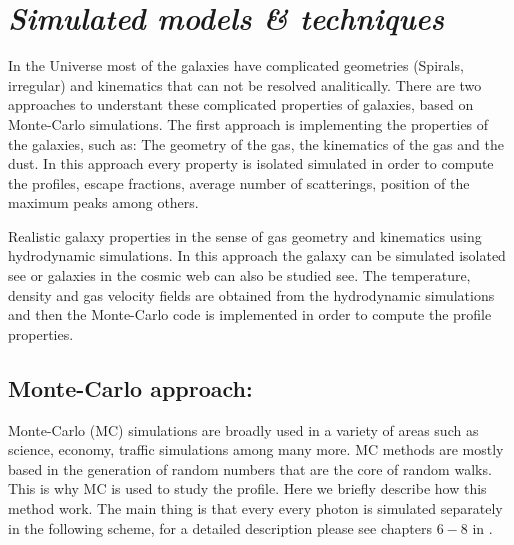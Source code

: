 \section{\emph{Simulated models \& techniques}}

In the Universe most of the galaxies have complicated
geometries (Spirals, irregular) and kinematics that 
can not be resolved analitically. There are two approaches
to understant these complicated properties of galaxies, based
on Monte-Carlo simulations. The first approach is implementing 
the properties of the galaxies, such as: The geometry
of the gas, the kinematics of the gas and the dust. In this 
approach every property is isolated simulated in order
to compute the \ly profiles, escape fractions, average number
of scatterings, position of the maximum peaks among others. 

Realistic galaxy properties in the sense of gas geometry
and kinematics using hydrodynamic simulations. In this 
approach the galaxy can be simulated isolated see \citep{Verhamme12}
or galaxies in the cosmic web can also be studied see\citep{Yajima12}.
The temperature, density and gas velocity fields are obtained from 
the hydrodynamic simulations and then the Monte-Carlo code is 
implemented in order to compute the profile properties.

\subsection{Monte-Carlo approach:}

Monte-Carlo (MC) simulations are broadly used in a variety of 
areas such as science, economy, traffic simulations among 
many more. MC methods are mostly based in the
generation of random numbers that are the core of 
random walks. This is why MC is used to study the
\ly profile. Here we briefly describe how this method 
work. The main thing is that every every \ly photon is simulated
separately in the following scheme, for a detailed description 
please see chapters $6-8$ in \citep{LaursenPhD} .

